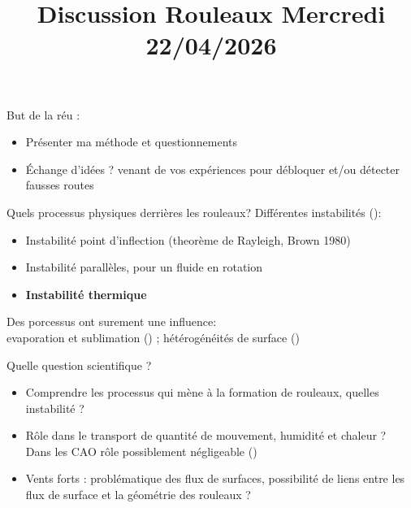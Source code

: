 
\usepackage[style=authoryear, backend=biber]{biblatex}

\graphicspath{{FIGURES/}}

\title{Discussion Rouleaux Mercredi 22/04/2026}
\author{}

\usepackage[caption = false]{subfig}

\begin{frame}
\maketitle
\end{frame}

\begin{frame}{But de la réu :}
  \begin{itemize}
    \item Présenter ma méthode et questionnements
    \item Échange d'idées ? venant de vos expériences pour débloquer et/ou détecter fausses routes 
  \end{itemize}
\end{frame}



\begin{frame}{Quels processus physiques derrières les rouleaux?}
Différentes instabilités (\cite{etlingRollVorticesPlanetary1993}):
\begin{itemize}
	\item Instabilité point d'inflection (theorème de Rayleigh, Brown 1980)
	\item Instabilité parallèles, pour un fluide en rotation 
	\item \textbf{Instabilité thermique} 
\end{itemize}

Des porcessus ont surement une influence: \\
evaporation et sublimation (\cite{riviereDownwardTransportMomentum2020}) ;  hétérogénéités de surface (\cite{gryschkaInfluenceSeaiceInhomogeneities2008})

\end{frame}

\begin{frame}{Quelle question scientifique ?}
	\begin{itemize}
		\item Comprendre les processus qui mène à la formation de rouleaux, quelles instabilité ? 
		\item Rôle dans le transport de quantité de mouvement, humidité et chaleur ?  \\
		Dans les CAO rôle possiblement négligeable (\cite{gryschkaImpactForcedRoll2014})
		\item Vents forts : problématique des flux de surfaces, possibilité de liens entre les flux de surface et la géométrie des rouleaux ?  \cite{lfarhImpactSurfaceTurbulent2024}
	\end{itemize}
\end{frame}


